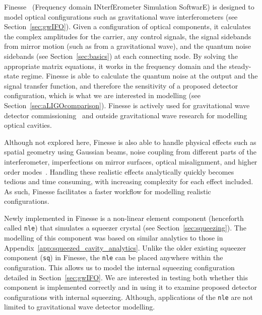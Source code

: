 \documentclass[aps,pra,superscriptaddress,reprint,nofootinbib]{revtex4-1}
\newcommand{\code}[1]{\texttt{#1}}
\begin{document}
Finesse~\cite{finesse} (Frequency domain INterfErometer Simulation SoftwarE) is designed to model optical configurations such as gravitational wave interferometers (see Section~\ref{sec:gwIFO}). Given a configuration of optical components, it calculates the complex amplitudes for the carrier, any control signals, the signal sidebands from mirror motion (such as from a gravitational wave), and the quantum noise sidebands (see Section~\ref{sec:basics}) at each connecting node. By solving the appropriate matrix equations, it works in the frequency domain and the steady-state regime.
Finesse is able to calculate the quantum noise at the output and the signal transfer function, and therefore the sensitivity of a proposed detector configuration, which is what we are interested in modelling (see Section~\ref{sec:aLIGOcomparison}). Finesse is actively used for gravitational wave detector commissioning~\cite{brown2020pykat} and outside gravitational wave research for modelling optical cavities.


Although not explored here, Finesse is also able to handle physical effects such as spatial geometry using Gaussian beams, noise coupling from different parts of the interferometer, imperfections on mirror surfaces, optical misalignment, and higher order modes~\cite{Bond_et_al_2016}.
Handling these realistic effects analytically quickly becomes tedious and time consuming, with increasing complexity for each effect included. As such, Finesse facilitates a faster workflow for modelling realistic configurations.


Newly implemented in Finesse is a non-linear element component (henceforth called \code{nle}) that simulates a squeezer crystal (see Section~\ref{sec:squeezing}). The modelling of this component was based on similar analytics to those in Appendix~\ref{app:squeezed_cavity_analytics}. Unlike the older existing squeezer component (\code{sq}) in Finesse, the \code{nle} can be placed anywhere within the configuration. This allows us to model the internal squeezing configuration detailed in Section~\ref{sec:gwIFO}. We are interested in testing both whether this component is implemented correctly and in using it to examine proposed detector configurations with internal squeezing. Although, applications of the \code{nle} are not limited to gravitational wave detector modelling.
\end{document}
